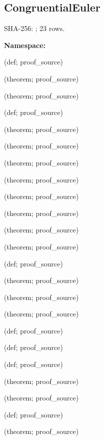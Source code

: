 \subsection*{CongruentialEuler}
{\footnotesize SHA-256: ; 23 rows.}\par
\begingroup\small
\textbf{Namespace:} \par
\noindent{} {\scriptsize (def; proof\_source)}\par
\noindent{} {\scriptsize (theorem; proof\_source)}\par
\noindent{} {\scriptsize (theorem; proof\_source)}\par
\noindent{} {\scriptsize (def; proof\_source)}\par
\noindent{} {\scriptsize (theorem; proof\_source)}\par
\noindent{} {\scriptsize (theorem; proof\_source)}\par
\noindent{} {\scriptsize (theorem; proof\_source)}\par
\noindent{} {\scriptsize (theorem; proof\_source)}\par
\noindent{} {\scriptsize (theorem; proof\_source)}\par
\noindent{} {\scriptsize (theorem; proof\_source)}\par
\noindent{} {\scriptsize (theorem; proof\_source)}\par
\noindent{} {\scriptsize (theorem; proof\_source)}\par
\noindent{} {\scriptsize (def; proof\_source)}\par
\noindent{} {\scriptsize (theorem; proof\_source)}\par
\noindent{} {\scriptsize (theorem; proof\_source)}\par
\noindent{} {\scriptsize (theorem; proof\_source)}\par
\noindent{} {\scriptsize (def; proof\_source)}\par
\noindent{} {\scriptsize (def; proof\_source)}\par
\noindent{} {\scriptsize (def; proof\_source)}\par
\noindent{} {\scriptsize (theorem; proof\_source)}\par
\noindent{} {\scriptsize (theorem; proof\_source)}\par
\noindent{} {\scriptsize (def; proof\_source)}\par
\noindent{} {\scriptsize (theorem; proof\_source)}\par
\endgroup
